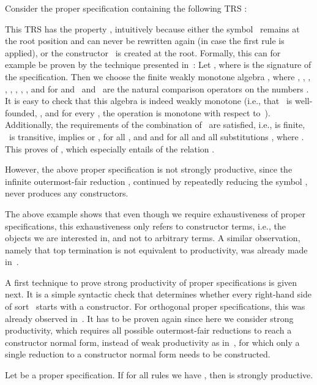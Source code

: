 \documentclass{eptcs}
\begin{document}
\begin{example}
\label{ex:CexpSNinf}
Consider the proper specification containing the following TRS :


This TRS has the property , intuitively because either the
symbol~ remains at the root position and can never be rewritten again
(in case the first rule is applied), or the constructor~ is created at the
root. Formally, this can for example be proven by the technique presented
in~\cite{Z08}: Let ,
where  is the signature of
the specification.
Then we choose the finite weakly monotone  algebra
, where , ,
,
, , ,
, , and  for
 and~ and~ are the natural comparison operators on
the numbers .
It is easy to check that this algebra is indeed weakly monotone (i.e., that
~is well-founded, , and
for every , the operation  is monotone with respect
to~). Additionally, the requirements of the combination
of~\cite[Theorem~5 and Theorem~6]{Z08} are satisfied, i.e.,  is
finite, ~is transitive,  implies  or ,
 for all , and
 and 
for all  and all substitutions , where
.
This proves  of , which especially entails  of the
relation .

However, the above proper specification is not strongly productive, since the
infinite outermost-fair reduction
,
continued by repeatedly reducing the symbol ,
never produces any constructors.
\end{example}

The above example shows that even though we require exhaustiveness of proper
specifications, this exhaustiveness only refers to constructor terms, i.e., the
objects we are interested in, and not to arbitrary terms. A similar observation,
namely that top termination is not equivalent to productivity, was already made
in~\cite{ZR09}.

A first technique to prove strong productivity of proper specifications is given
next. It is a simple syntactic check that determines whether every right-hand
side of sort~ starts with a constructor. For orthogonal proper
specifications, this was already observed in~\cite{ZR10}. It has to be proven
again since here we consider strong productivity, which requires all possible
outermost-fair reductions to reach a constructor normal form, instead of weak
productivity as in~\cite{ZR10}, for which only a single reduction to a
constructor normal form needs to be constructed.

\begin{theorem}
\label{thm:SyntacticCheck}
Let  be a proper specification.
If for all rules  we have , then  is
strongly productive.
\end{theorem}
\end{document}
